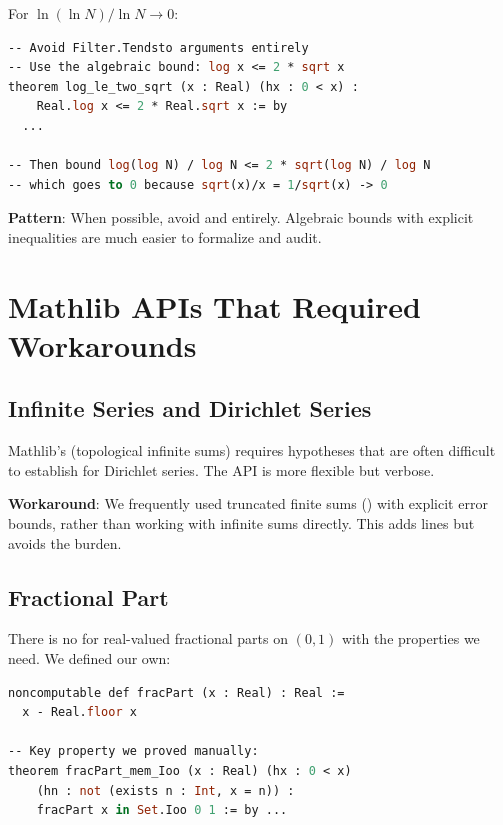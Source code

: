 \documentclass[11pt,a4paper]{article}
\begin{document}
For $\ln(\ln N) / \ln N \to 0$:

\begin{lstlisting}[language=ML,caption={Algebraic limit proof}]
-- Avoid Filter.Tendsto arguments entirely
-- Use the algebraic bound: log x <= 2 * sqrt x
theorem log_le_two_sqrt (x : Real) (hx : 0 < x) :
    Real.log x <= 2 * Real.sqrt x := by
  ...

-- Then bound log(log N) / log N <= 2 * sqrt(log N) / log N
-- which goes to 0 because sqrt(x)/x = 1/sqrt(x) -> 0
\end{lstlisting}

\textbf{Pattern}: When possible, avoid  and
 entirely. Algebraic bounds with explicit
inequalities are much easier to formalize and audit.

\section{Mathlib APIs That Required Workarounds}
\label{sec:workarounds}

\subsection{Infinite Series and Dirichlet Series}

Mathlib's  (topological infinite sums) requires
 hypotheses that are often difficult to establish
for Dirichlet series. The  API is more flexible but
verbose.

\textbf{Workaround}: We frequently used truncated finite sums
() with explicit error bounds, rather than
working with infinite sums directly. This adds lines but avoids
the  burden.

\subsection{Fractional Part}

There is no  for real-valued fractional parts on
$(0,1)$ with the properties we need. We defined our own:

\begin{lstlisting}[language=ML,caption={Fractional part definition}]
noncomputable def fracPart (x : Real) : Real :=
  x - Real.floor x

-- Key property we proved manually:
theorem fracPart_mem_Ioo (x : Real) (hx : 0 < x)
    (hn : not (exists n : Int, x = n)) :
    fracPart x in Set.Ioo 0 1 := by ...
\end{lstlisting}
\end{document}

